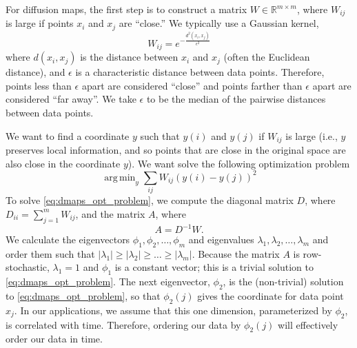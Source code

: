 \documentclass{pnastwo}
\DeclareMathOperator*{\argmin}{arg\,min}
\begin{document}
\begin{article}
\begin{materials}
For diffusion maps, the first step is to construct a matrix $W \in \mathbb{R}^{m \times m}$, where $W_{ij}$ is large if points $x_i$ and $x_j$ are ``close.'' 
%
%
We typically use a Gaussian kernel, 
\begin{equation} \label{eq:dmaps_W}
W_{ij} = e^{ -\frac{d^2(x_i, x_j)}{\epsilon^2}}
\end{equation}
where $d(x_i, x_j)$ is the distance between $x_i$ and $x_j$ (often the Euclidean distance), and $\epsilon$ is a characteristic distance between data points.
%
Therefore, points less than $\epsilon$ apart are considered ``close'' and points farther than $\epsilon$ apart are considered ``far away''.
%
We take $\epsilon$ to be the median of the pairwise distances between data points.

We want to find a coordinate $y$ such that $y(i)$ and $y(j)$ if $W_{ij}$ is large (i.e., $y$ preserves local information, and so points that are close in the original space are also close in the coordinate $y$).
%
We want solve the following optimization problem \cite{Belkin2003}
\begin{equation} \label{eq:dmaps_opt_problem}
\argmin_{y} \sum_{ij} W_{ij} (y(i) - y(j))^2
\end{equation}
%
%
To solve \eqref{eq:dmaps_opt_problem}, we compute the diagonal matrix $D$, where $D_{ii} = \sum_{j=1}^{m} W_{ij}$, and the matrix $A$, where
\begin{equation} \label{eq:dmaps_A}
A = D^{-1} W.
\end{equation} 
%
We calculate the eigenvectors $\phi_1, \phi_2, \dots, \phi_m$ and eigenvalues $\lambda_1, \lambda_2, \dots, \lambda_m$ and order them such that $|\lambda_1| \ge |\lambda_2| \ge \dots \ge |\lambda_m|$.
%
%
Because the matrix $A$ is row-stochastic, $\lambda_1=1$ and $\phi_1$ is a constant vector; this is a trivial solution to \eqref{eq:dmaps_opt_problem}.
%
%
The next eigenvector, $\phi_2$, is the (non-trivial) solution to \eqref{eq:dmaps_opt_problem}, so that $\phi_2(j)$ gives the coordinate for data point $x_j$.
%
In our applications, we assume that this one dimension, parameterized by $\phi_2$, is correlated with time.
%
Therefore, ordering our data by $\phi_2(j)$ will effectively order our data in time.


\end{materials}
\end{article}
\end{document}
